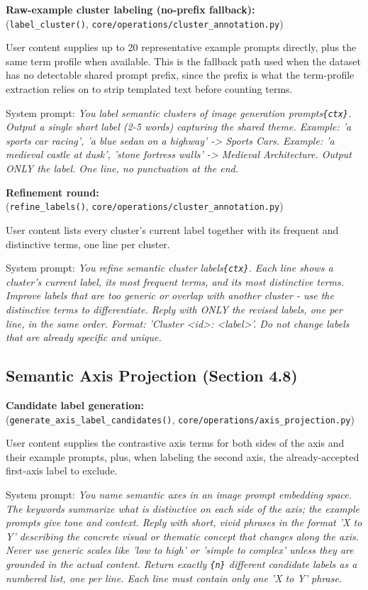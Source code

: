 \textbf{Raw-example cluster labeling (no-prefix fallback):}\\
(\texttt{label\_cluster()}, \texttt{core/operations/cluster\_annotation.py})

User content supplies up to 20 representative example prompts directly, plus the same term profile when available. This is the fallback path used when the dataset has no detectable shared prompt prefix, since the prefix is what the term-profile extraction relies on to strip templated text before counting terms.

System prompt: \textit{You label semantic clusters of image generation prompts\texttt{\{ctx\}}. Output a single short label (2-5 words) capturing the shared theme. Example: 'a sports car racing', 'a blue sedan on a highway' -> Sports Cars. Example: 'a medieval castle at dusk', 'stone fortress walls' -> Medieval Architecture. Output ONLY the label. One line, no punctuation at the end.}

\textbf{Refinement round:}\\
(\texttt{refine\_labels()}, \texttt{core/operations/cluster\_annotation.py})

User content lists every cluster's current label together with its frequent and distinctive terms, one line per cluster.

System prompt: \textit{You refine semantic cluster labels\texttt{\{ctx\}}. Each line shows a cluster's current label, its most frequent terms, and its most distinctive terms. Improve labels that are too generic or overlap with another cluster - use the distinctive terms to differentiate. Reply with ONLY the revised labels, one per line, in the same order. Format: 'Cluster <id>: <label>'. Do not change labels that are already specific and unique.}

\subsection{Semantic Axis Projection (Section 4.8)}\label{app:3-axis-projection}

\textbf{Candidate label generation:}\\
(\texttt{generate\_axis\_label\_candidates()}, \texttt{core/operations/axis\_projection.py})

User content supplies the contrastive axis terms for both sides of the axis and their example prompts, plus, when labeling the second axis, the already-accepted first-axis label to exclude.

System prompt: \textit{You name semantic axes in an image prompt embedding space. The keywords summarize what is distinctive on each side of the axis; the example prompts give tone and context. Reply with short, vivid phrases in the format 'X to Y' describing the concrete visual or thematic concept that changes along the axis. Never use generic scales like 'low to high' or 'simple to complex' unless they are grounded in the actual content. Return exactly \texttt{\{n\}} different candidate labels as a numbered list, one per line. Each line must contain only one 'X to Y' phrase.}

